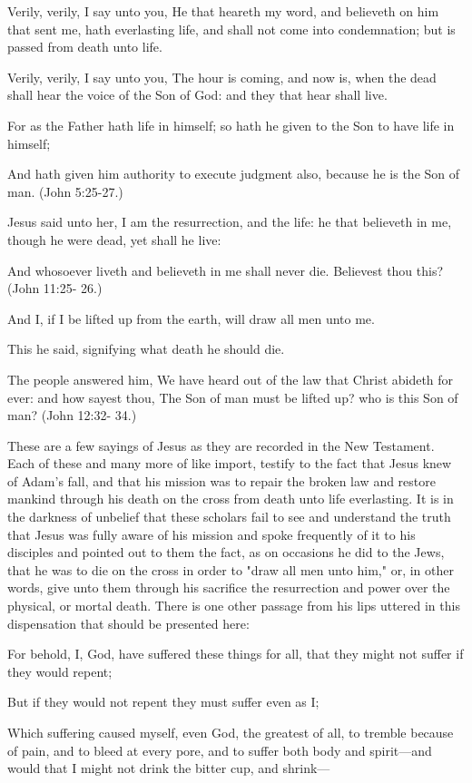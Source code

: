 Verily, verily, I say unto you, He that heareth my word, and believeth on him that sent me,
hath everlasting life, and shall not come into condemnation; but is passed from death unto
life.

Verily, verily, I say unto you, The hour is coming, and now is, when the dead shall hear the
voice of the Son of God: and they that hear shall live.

For as the Father hath life in himself; so hath he given to the Son to have life in himself;

And hath given him authority to execute judgment also, because he is the Son of man. (John
5:25-27.)

Jesus said unto her, I am the resurrection, and the life: he that believeth in me, though he
were dead, yet shall he live:

And whosoever liveth and believeth in me shall never die. Believest thou this? (John 11:25-
26.)

And I, if I be lifted up from the earth, will draw all men unto me.

This he said, signifying what death he should die.

The people answered him, We have heard out of the law that Christ abideth for ever: and
how sayest thou, The Son of man must be lifted up? who is this Son of man? (John 12:32-
34.)

These are a few sayings of Jesus as they are recorded in the New Testament. Each of these
and many more of like import, testify to the fact that Jesus knew of Adam's fall, and that his
mission was to repair the broken law and restore mankind through his death on the cross
from death unto life everlasting. It is in the darkness of unbelief that these scholars fail to see
and understand the truth that Jesus was fully aware of his mission and spoke frequently of it
to his disciples and pointed out to them the fact, as on occasions he did to the Jews, that he
was to die on the cross in order to "draw all men unto him," or, in other words, give unto
them through his sacrifice the resurrection and power over the physical, or mortal death.
There is one other passage from his lips uttered in this dispensation that should be presented
here:

For behold, I, God, have suffered these things for all, that they might not suffer if they would
repent;

But if they would not repent they must suffer even as I;

Which suffering caused myself, even God, the greatest of all, to tremble because of pain, and
to bleed at every pore, and to suffer both body and spirit—and would that I might not drink
the bitter cup, and shrink—

